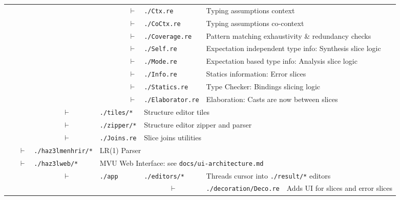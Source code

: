 \begin{figure}
{\begin{tabular}{lllllp{4cm}}
 & & {\color{blue}\ \ \ \ \ \ \ \ $\vdash$} & {\color{blue}\texttt{./Ctx.re}} & \multicolumn{2}{l}{Typing assumptions context}\\
 & & {\color{blue}\ \ \ \ \ \ \ \ $\vdash$} & {\color{blue}\texttt{./CoCtx.re}} & \multicolumn{2}{l}{Typing assumptions co-context}\\
 & & {\color{blue}\ \ \ \ \ \ \ \ $\vdash$} & {\color{blue}\texttt{./Coverage.re}} & \multicolumn{2}{l}{Pattern matching exhaustivity \& redundancy checks}\\
 & & {\color{orange}\ \ \ \ \ \ \ \ $\vdash$} & {\color{orange}\texttt{./Self.re}} & \multicolumn{2}{l}{Expectation independent type info: Synthesis slice logic}\\
 & & {\color{orange}\ \ \ \ \ \ \ \ $\vdash$} & {\color{orange}\texttt{./Mode.re}} & \multicolumn{2}{l}{Expectation based type info: Analysis slice logic}\\
 & & {\color{orange}\ \ \ \ \ \ \ \ $\vdash$} & {\color{orange}\texttt{./Info.re}} & \multicolumn{2}{l}{Statics information: Error slices}\\
 & & {\color{orange}\ \ \ \ \ \ \ \ $\vdash$} & {\color{orange}\texttt{./Statics.re}} & \multicolumn{2}{l}{Type Checker: Bindings slicing logic}\\
 & & {\color{orange}\ \ \ \ \ \ \ \ $\vdash$} & {\color{orange}\texttt{./Elaborator.re}} & \multicolumn{2}{l}{Elaboration: Casts are now between slices}\\
 & {\color{blue}\ \ \ \ \ \ \ \ $\vdash$} & {\color{blue}\texttt{./tiles/*}} & \multicolumn{3}{l}{Structure editor tiles}\\
 & {\color{blue}\ \ \ \ \ \ \ \ $\vdash$} & {\color{blue}\texttt{./zipper/*}} & \multicolumn{3}{l}{Structure editor zipper and parser}\\
 & {\color{Green}\ \ \ \ \ \ \ \ $\vdash$} & {\color{Green}\texttt{./Joins.re}} & \multicolumn{3}{l}{Slice joins utilities}\\
 {\color{blue}\ \ \ $\vdash$}&{\color{blue}\texttt{./haz3lmenhrir/*}} & \multicolumn{4}{l}{LR(1) Parser}\\
 {\color{orange}\ \ \ $\vdash$}&{\color{orange}\texttt{./haz3lweb/*}} & \multicolumn{4}{l}{MVU Web Interface: see \texttt{docs/ui-architecture.md}}\\
&{\color{orange}\ \ \ \ \ \ \ \  $\vdash$} & {\color{orange}\texttt{./app}} & {\color{orange}\texttt{./editors/*}} & \multicolumn{2}{l}{Threads cursor into \texttt{./result/*} editors}\\
& & &{\color{orange}\ \ \ \ \ \ \ $\vdash$} & {\color{orange}\texttt{./decoration/Deco.re}} & {Adds UI for slices and error slices}\\

\end{tabular}}
\end{figure}
